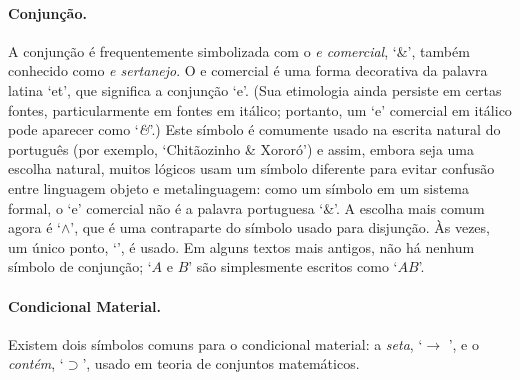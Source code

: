 \paragraph{Conjunção.}
A conjunção é frequentemente simbolizada com o \emph{e comercial}, `{\&}', também conhecido como \emph{e sertanejo}. O e comercial é uma forma decorativa da palavra latina `et', que significa a conjunção `e'. (Sua etimologia ainda persiste em certas fontes, particularmente em fontes em itálico; portanto, um `e' comercial em itálico pode aparecer como `\emph{\&}'.) Este símbolo é comumente usado na escrita natural do português (por exemplo, `Chitãozinho \& Xororó') e assim, embora seja uma escolha natural, muitos lógicos usam um símbolo diferente para evitar confusão entre linguagem objeto e metalinguagem: como um símbolo em um sistema formal, o `e' comercial não é a palavra portuguesa `\&'. A escolha mais comum agora é `$\wedge$', que é uma contraparte do símbolo usado para disjunção. Às vezes, um único ponto, `{\scriptsize\textbullet}', é usado. Em alguns textos mais antigos, não há nenhum símbolo de conjunção; `$A$ e $B$' são simplesmente escritos como `$AB$'.

\paragraph{Condicional Material.} Existem dois símbolos comuns para o condicional material: a \emph{seta}, `$\rightarrow$ ', e o \emph{contém}, `$\supset$', usado em teoria de conjuntos matemáticos.

